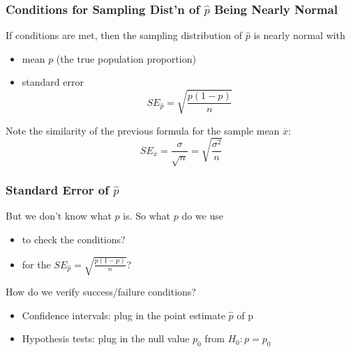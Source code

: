 \documentclass[slides]{beamer}
\newcommand{\blue}[1]{\textcolor{blue2}{#1}}
\newcommand{\xbar}{\overline{x}}
\newcommand{\phat}{\widehat{p}}
\begin{document}
\begin{frame}[fragile]
\frametitle{Conditions for Sampling Dist'n of $\phat$ Being Nearly Normal}

If conditions are met, then the sampling distribution of $\phat$ is nearly normal with
\begin{itemize}
\item mean $p$ (the true population proportion)
\item standard error
\[
SE_{\phat} = \sqrt{\frac{p(1-p)}{n}}
\]
\end{itemize}

\pause Note the similarity of the previous formula for the sample mean $\xbar$: 
\[
SE_{\xbar} = \frac{\sigma}{\sqrt{n}} = \sqrt{\frac{\sigma^2}{n}}
\]

\end{frame}


\begin{frame}[fragile]
\frametitle{Standard Error of $\phat$}
But we \blue{don't know} what $p$ is.  So what $p$ do we use
\begin{itemize}
\item to check the conditions?
\item for the $SE_{\phat} = \sqrt{\frac{p(1-p)}{n}}$?
\end{itemize}


How do we verify success/failure conditions?

\vspace{0.5cm}

\begin{itemize}
\pause \item Confidence intervals: plug in the \blue{point estimate} $\phat$ of p
\pause \item Hypothesis tests: plug in the \blue{null value} $p_0$ from $H_0: p=p_0$
\end{itemize}

\end{frame}
\end{document}

